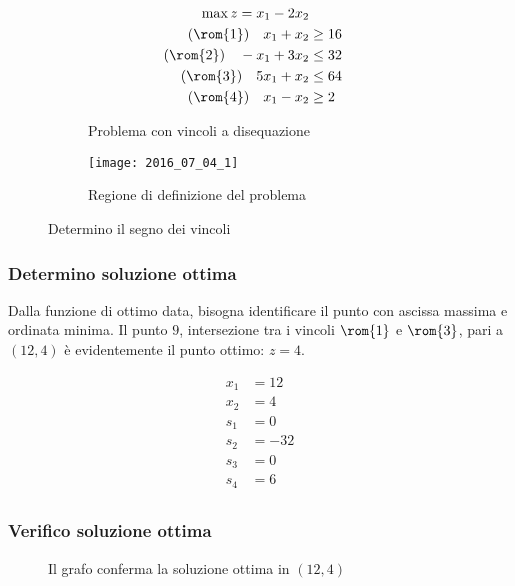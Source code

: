 \documentclass[\main/main.tex]{subfiles}
\begin{document}
\begin{figure}
  \begin{subfigure}{0.49\textwidth}
    \begin{align*}
      \max z = x_1 -2x_2                   \\
      (\rom{1})\quad x_1 + x_2   & \geq 16 \\
      (\rom{2})\quad -x_1 + 3x_2 & \leq 32 \\
      (\rom{3})\quad 5x_1 + x_2  & \leq 64 \\
      (\rom{4})\quad x_1 - x_2   & \geq 2
    \end{align*}
    \caption{Problema con vincoli a disequazione}
  \end{subfigure}
  \begin{subfigure}{0.49\textwidth}
    \texttt{[image: 2016\_07\_04\_1]}
    \caption{Regione di definizione del problema}
  \end{subfigure}
  \caption{Determino il segno dei vincoli}
\end{figure}

\subsubsection*{Determino soluzione ottima}
Dalla funzione di ottimo data, bisogna identificare il punto con ascissa massima e ordinata minima. Il punto $9$, intersezione tra i vincoli $\rom{1}$ e $\rom{3}$, pari a $(12,4)$ è evidentemente il punto ottimo: $z = 4$.

\begin{align*}
  x_1 & = 12  \\
  x_2 & = 4   \\
  s_1 & = 0   \\
  s_2 & = -32 \\
  s_3 & = 0   \\
  s_4 & = 6   \\
\end{align*}

\subsubsection*{Verifico soluzione ottima}

\begin{figure}
  \caption{Il grafo conferma la soluzione ottima in $(12,4)$}
\end{figure}
\end{document}
